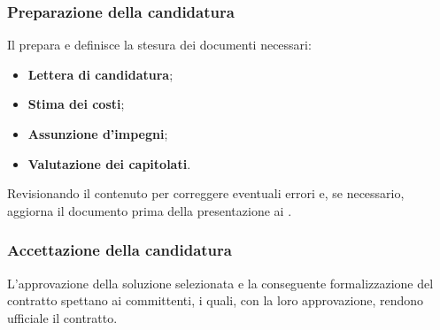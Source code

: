 \subsubsection{Preparazione della candidatura}
Il  prepara e definisce la stesura dei documenti necessari:
\begin{itemize}
    \item \textbf{Lettera di candidatura};
    \item \textbf{Stima dei costi};
    \item \textbf{Assunzione d’impegni};
    \item \textbf{Valutazione dei capitolati}.
\end{itemize}
Revisionando il contenuto per correggere eventuali errori e, se necessario, aggiorna il documento prima della presentazione ai .

\subsubsection{Accettazione della candidatura}
L'approvazione della soluzione selezionata e la conseguente formalizzazione del contratto spettano ai committenti, i quali, con la loro approvazione, rendono ufficiale il contratto.